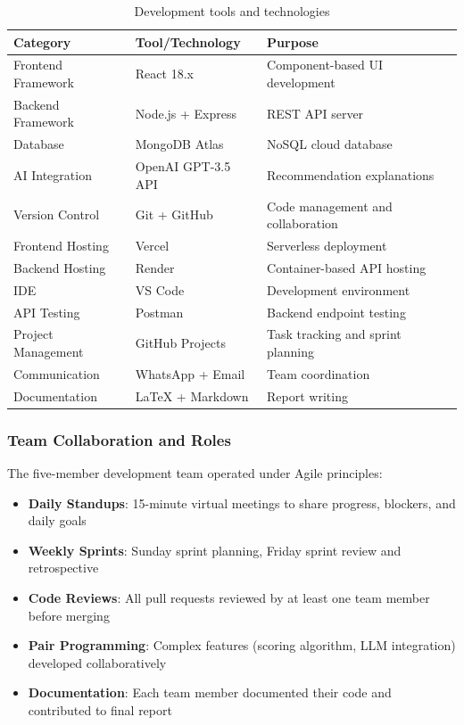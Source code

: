 \documentclass[12pt, a4paper]{article}
\newcommand{\theadrow}{\rowcolor{tableheader}}
\newcommand{\rowalt}{\rowcolor{tablerowalt}}
\begin{document}
\begin{table}[H]
\centering
\small
\begin{tabularx}{\textwidth}{>{\raggedright\arraybackslash}p{3.5cm}>{\raggedright\arraybackslash}p{3cm}>{\raggedright\arraybackslash}X}
\toprule
\theadrow
\textbf{Category} & \textbf{Tool/Technology} & \textbf{Purpose} \\
\midrule
Frontend Framework & React 18.x & Component-based UI development \\[3pt]
\rowalt
Backend Framework & Node.js + Express & REST API server \\[3pt]
Database & MongoDB Atlas & NoSQL cloud database \\[3pt]
\rowalt
AI Integration & OpenAI GPT-3.5 API & Recommendation explanations \\[3pt]
Version Control & Git + GitHub & Code management and collaboration \\[3pt]
\rowalt
Frontend Hosting & Vercel & Serverless deployment \\[3pt]
Backend Hosting & Render & Container-based API hosting \\[3pt]
\rowalt
IDE & VS Code & Development environment \\[3pt]
API Testing & Postman & Backend endpoint testing \\[3pt]
\rowalt
Project Management & GitHub Projects & Task tracking and sprint planning \\[3pt]
Communication & WhatsApp + Email & Team coordination \\[3pt]
\rowalt
Documentation & LaTeX + Markdown & Report writing \\[3pt]
\bottomrule
\end{tabularx}
\caption{Development tools and technologies}
\end{table}

\subsubsection*{Team Collaboration and Roles}

The five-member development team operated under Agile principles:

\begin{itemize}[leftmargin=1.5em, itemsep=3pt]
    \item \textbf{Daily Standups}: 15-minute virtual meetings to share progress, blockers, and daily goals
    \item \textbf{Weekly Sprints}: Sunday sprint planning, Friday sprint review and retrospective
    \item \textbf{Code Reviews}: All pull requests reviewed by at least one team member before merging
    \item \textbf{Pair Programming}: Complex features (scoring algorithm, LLM integration) developed collaboratively
    \item \textbf{Documentation}: Each team member documented their code and contributed to final report
\end{itemize}
\end{document}
